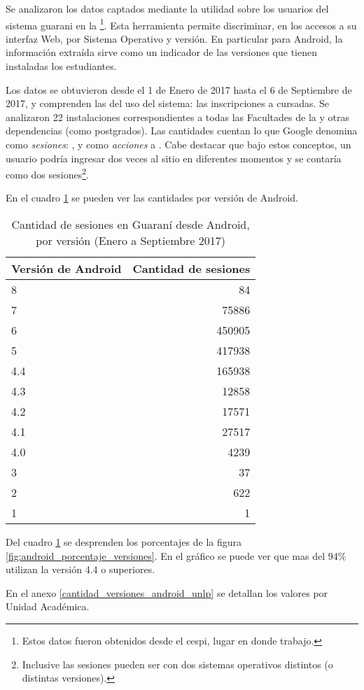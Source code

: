  Se analizaron los datos captados mediante la utilidad  sobre los usuarios del sistema \gls{guarani} en la \unlp{}\footnote{Estos datos fueron obtenidos desde el \gls{cespi}, lugar en donde trabajo.}. Esta herramienta permite discriminar, en los accesos a su interfaz Web, por Sistema Operativo y versión. En particular para Android, la información extraída sirve como un indicador de las versiones que tienen instaladas los estudiantes.

Los datos se obtuvieron desde el 1 de Enero de 2017 hasta el 6 de Septiembre de 2017, y comprenden las  del uso del sistema: las inscripciones a cursadas. Se analizaron 22 instalaciones correspondientes a todas las Facultades de la \unlp{} y otras dependencias (como postgrados).
Las cantidades cuentan lo que Google denomina como \textit{sesiones}: , y como \textit{acciones} a \cite{google2017analyticsSesion}.
Cabe destacar que bajo estos conceptos, un usuario podría ingresar dos veces al sitio en diferentes momentos y se contaría como dos sesiones\footnote{Inclusive las sesiones pueden ser con dos sistemas operativos distintos (o distintas versiones).}. 

En el cuadro \ref{android_versiones_cantidad} se pueden ver las cantidades por versión de Android.

\begin{table}[htbp]
\centering
\caption{Cantidad de sesiones en Guaraní desde Android, por versión (Enero a Septiembre 2017)}
\label{android_versiones_cantidad}
\begin{tabular}{|l|r|}
\hline
\textbf{Versión de Android} & \multicolumn{1}{l|}{\textbf{Cantidad de sesiones}} \\ \hline
8   & 84     \\ \hline
7   & 75886  \\ \hline
6   & 450905 \\ \hline
5   & 417938 \\ \hline
4.4 & 165938 \\ \hline
4.3 & 12858  \\ \hline
4.2 & 17571  \\ \hline
4.1 & 27517  \\ \hline
4.0 & 4239   \\ \hline
3   & 37     \\ \hline
2   & 622    \\ \hline
1   & 1     \\ \hline
\end{tabular}
\end{table}

Del cuadro \ref{android_versiones_cantidad} se desprenden los porcentajes de la figura \ref{fig:android_porcentaje_versiones}. En el gráfico se puede ver que mas del 94\% utilizan la versión 4.4 o superiores.


En el anexo \ref{cantidad_versiones_android_unlp} se detallan los valores por Unidad Académica.